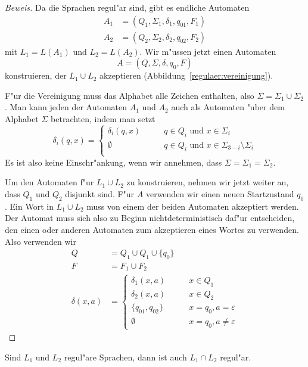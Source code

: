 \begin{proof}[Beweis]
Da die Sprachen regul"ar sind, gibt es endliche Automaten 
\begin{align*}
A_1&=(Q_1,\Sigma_1,\delta_1, q_{01}, F_1)\\
A_2&=(Q_2,\Sigma_2,\delta_2, q_{02}, F_2)
\end{align*}
mit $L_1=L(A_1)$ und $L_2=L(A_2)$. Wir m"ussen
jetzt einen Automaten
\[
A = (Q, \Sigma, \delta, q_0, F)
\]
konstruieren, der $L_1\cup L_2$ akzeptieren
(Abbildung~\ref{regulaer:vereinigung}).

F"ur die Vereinigung muss das Alphabet alle Zeichen enthalten,
also $\Sigma = \Sigma_1\cup\Sigma_2$. Man kann jeden der Automaten 
$A_1$ und $A_2$ auch als Automaten "uber dem Alphabet $\Sigma$
betrachten, indem man setzt
\[
\delta_i(q, x)=\begin{cases}
\delta_i(q,x)&\qquad q\in Q_i\text{ und }  x\in \Sigma_i\\
\emptyset&\qquad q\in Q_i\text{ und } x\in \Sigma_{3-i}\setminus \Sigma_i\\
\end{cases}
\]
Es ist also keine Einschr"ankung, wenn wir annehmen, dass
$\Sigma=\Sigma_1=\Sigma_2$.

Um den Automaten f"ur $L_1\cup L_2$ zu konstruieren, nehmen wir jetzt
weiter an, dass $Q_1$ und $Q_2$ disjunkt sind.
F"ur $A$ verwenden wir einen neuen Startzustand $q_0$.
Ein Wort in $L_1\cup L_2$ muss von einem der beiden Automaten
akzeptiert werden.
Der Automat muss sich also zu Beginn nichtdeterministisch
daf"ur entscheiden, den einen oder anderen Automaten zum
akzeptieren eines Wortes zu verwenden.
Also verwenden wir 
\begin{align*}
Q&=Q_1\cup Q_1\cup \{q_0\}\\
F&=F_1\cup F_2\\
\delta(x,a)&=\begin{cases}
\delta_1(x,a)&\qquad x\in Q_1\\
\delta_2(x,a)&\qquad x\in Q_2\\
\{q_{01}, q_{02}\}&\qquad x=q_0, a=\varepsilon\\
\emptyset&\qquad x=q_0, a\ne\varepsilon
\end{cases}
\end{align*}
\end{proof}

\begin{satz}
\label{satz_intersection}
Sind $L_1$ und $L_2$ regul"are Sprachen, dann
ist auch $L_1\cap L_2$ regul"ar.
\end{satz}

